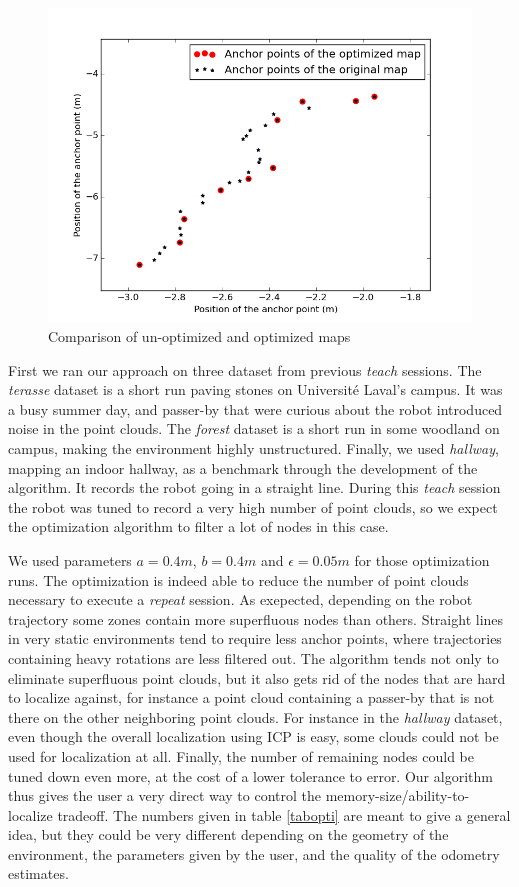 \documentclass[letterpaper,10 pt,conference]{ieeeconf}
\begin{document}
\begin{figure}
  \centering
  \includegraphics[scale=0.4]{map_optimization}
  \caption{Comparison of un-optimized and optimized maps}
\end{figure}

First we ran our approach on three dataset from previous \textit{teach} sessions. The
\textit{terasse} dataset is a short run paving stones on Université Laval's campus. It was a busy
summer day, and passer-by that were curious about the robot introduced noise in the point
clouds. The \textit{forest} dataset is a short run in some woodland on campus, making the environment
highly unstructured. Finally, we used \textit{hallway}, mapping an indoor hallway, as a
benchmark through the development of the algorithm. It records the robot going in a straight line.
During this \textit{teach} session the robot was tuned to record a very high number of point clouds,
so we expect the optimization algorithm to filter a lot of nodes in this case.

We used parameters $a=0.4 m$, $b=0.4 m$ and $\epsilon=0.05 m$ for those optimization runs. The
optimization is indeed able to reduce the number of point clouds necessary to execute a
\textit{repeat} session. As exepected, depending on the robot trajectory some zones contain more
superfluous nodes than others. Straight lines in very static environments tend to require less
anchor points, where trajectories containing heavy rotations are less filtered out. The algorithm
tends not only to eliminate superfluous point clouds, but it also gets rid of the nodes that are
hard to localize against, for instance a point cloud containing a passer-by that is not there on the
other neighboring point clouds. For instance in the \textit{hallway} dataset, even though the
overall localization using ICP is easy, some clouds could not be used for localization at all.
Finally, the number of remaining nodes could be tuned down even more, at the cost of a lower
tolerance to error. Our algorithm thus gives the user a very direct way to control the
memory-size/ability-to-localize tradeoff. The numbers given in table
\ref{tabopti} are meant to give a general idea, but they could be very different depending on the
geometry of the environment, the parameters given by the user, and the quality of the odometry
estimates.
\end{document}
